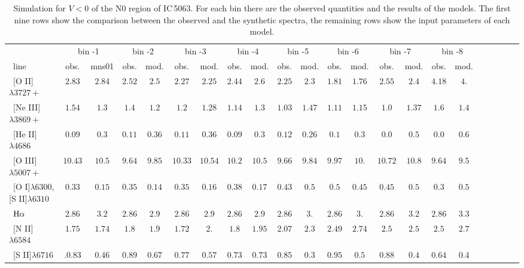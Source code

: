 \documentclass[../thesis.tex]{subfiles}
\begin{document}
\begin{landscape}
\begin{table}
\centering
\caption{Simulation for $V<0$ of the N0 region of IC\,5063.  For each bin there are the observed quantities and the results of the models. The first nine rows show the comparison between the observed and the synthetic spectra, the remaining rows show the input parameters of each model.}
\label{tab:sim_n0-}
\footnotesize{
\begin{tabular}{lccccccccccccccccccccc} 
\hline  
\ &\multicolumn{2}{c}{bin -1}&\multicolumn{2}{c}{bin -2}&\multicolumn{2}{c}{bin -3}&\multicolumn{2}{c}{bin -4}&\multicolumn{2}{c}{bin -5}&\multicolumn{2}{c}{bin -6}&\multicolumn{2}{c}{bin -7}&\multicolumn{2}{c}{bin -8}\\
\   line              &obs.  &mns01 &obs.&mod.  &obs.  &mod.&obs.  &mod. &obs.  &mod. & obs. & mod.&obs.&mod.& obs.&mod.\\ 
\hline
\ [O II]$\lambda3727+ $         &$2.83  $&$2.84  $&$2.52 $&$2.5   $&$2.27  $&$2.25 $&$2.44  $&$2.6   $&$2.25  $&$2.3   $&$1.81  $&$ 1.76 $&$ 2.55 $&$ 2.4 $&$ 4.18 $&$ 4.  $\\
\ [Ne III]$\lambda3869+ $       &$1.54  $&$ 1.3  $&$1.4  $&$1.2   $&$1.2   $&$1.28  $&$1.14  $&$1.3   $&$1.03  $&$1.47 $&$ 1.11 $&$ 1.15 $&$ 1.0  $&$ 1.37  $&$ 1.6  $&$ 1.4 $\\
\ [He II]$\lambda4686$           &$0.09  $&$ 0.3  $&$0.11 $&$0.36  $&$0.11  $&$0.36  $&$0.09  $&$0.3   $&$0.12  $&$0.26 $&$ 0.1  $&$ 0.3  $&$ 0.0  $&$ 0.5   $&$ 0.0  $&$ 0.6  $\\
\ [O III]$\lambda5007+ $        &$10.43 $&$ 10.5 $&$ 9.64$&$ 9.85 $&$ 10.33$&$ 10.54$&$ 10.2 $&$10.5  $&$9.66  $&$9.84 $&$9.97  $&$10.   $&$10.72 $&$ 10.8  $&$9.64  $&$ 9.5 $ \\
\ [O I]$\lambda6300$,[S II]$\lambda6310$  &$0.33  $&$0.15  $&$0.35 $&$0.14  $&$0.35  $&$0.16  $&$0.38  $&$0.17  $&$0.43  $&$0.5  $&$0.5   $&$ 0.45 $&$0.45  $&$ 0.5   $&$0.3   $&$ 0.5  $\\
\ $\rm H\alpha$                 &$2.86  $&$ 3.2  $&$2.86 $&$2.9   $&$2.86  $&$2.9   $&$2.86  $&$2.9   $&$2.86  $&$3.   $&$2.86  $&$ 3.   $&$ 2.86 $&$3.2    $&$2.86  $&$ 3.3  $\\
\ [N II]$\lambda6584$           &$1.75  $&$ 1.74 $&$1.8  $&$1.9   $&$1.72  $&$2.    $&$1.8   $&$1.95  $&$2.07  $&$2.3  $&$2.49  $&$ 2.74 $&$ 2.5  $&$2.5    $&$ 2.5  $&$ 2.7  $\\
\ [S II]$\lambda6716$           &$.0.83 $&$ 0.46 $&$0.89 $&$0.67  $&$0.77  $&$0.57  $&$0.73  $&$0.73  $&$0.85  $&$0.3  $&$0.95  $&$0.5   $&$0.88  $&$ 0.4   $&$ 0.64 $&$ 0.4  $\\

\end{tabular}}
\end{table}
\end{landscape}
\end{document}
